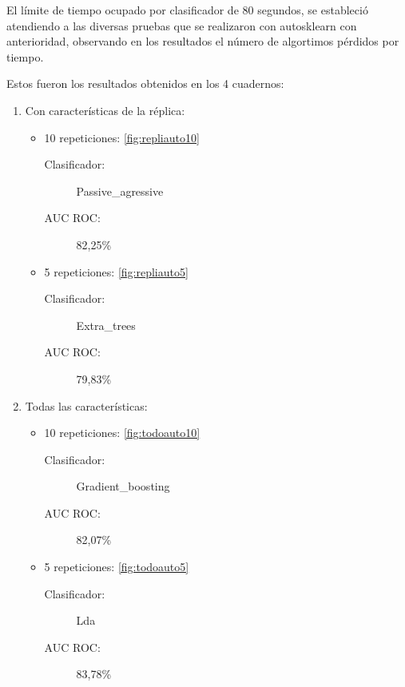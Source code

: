 El límite de tiempo ocupado por clasificador de 80 segundos, se estableció atendiendo a las diversas pruebas que se realizaron con autosklearn con anterioridad, observando en los resultados el número de algortimos pérdidos por tiempo.

Estos fueron los resultados obtenidos en los 4 cuadernos:

\begin{enumerate}
    \item Con características de la réplica:
    \begin{itemize}
        \item 10 repeticiones: \ref{fig:repliauto10}
        \begin{description}
            \item[Clasificador:] Passive\_agressive
            \item[AUC ROC:] 82,25\%
        \end{description}
        \item 5 repeticiones: \ref{fig:repliauto5}
        \begin{description}
            \item[Clasificador:] Extra\_trees
            \item[AUC ROC:] 79,83\%
        \end{description}
    \end{itemize}
    \item Todas las características:
    \begin{itemize}
        \item 10 repeticiones: \ref{fig:todoauto10}
        \begin{description}
            \item[Clasificador:] Gradient\_boosting
            \item[AUC ROC:] 82,07\%
        \end{description}
        \item 5 repeticiones: \ref{fig:todoauto5}
        \begin{description}
            \item[Clasificador:] Lda
            \item[AUC ROC:] 83,78\%
        \end{description}
    \end{itemize}
\end{enumerate}

